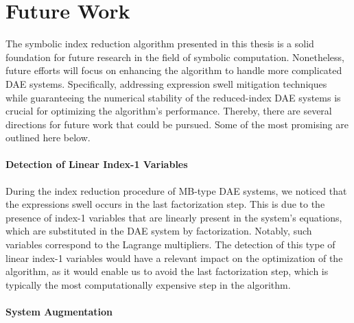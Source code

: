 \section{Future Work}
\label{chap5:sec:future_work}

The symbolic index reduction algorithm presented in this thesis is a solid foundation for future research in the field of symbolic computation. Nonetheless, future efforts will focus on enhancing the algorithm to handle more complicated \ac{DAE} systems. Specifically, addressing expression swell mitigation techniques while guaranteeing the numerical stability of the reduced-index \ac{DAE} systems is crucial for optimizing the algorithm's performance. Thereby, there are several directions for future work that could be pursued. Some of the most promising are outlined here below.

\paragraph{Detection of Linear Index-1 Variables}

During the index reduction procedure of \ac{MB}-type \ac{DAE} systems, we noticed that the expressions swell occurs in the last factorization step. This is due to the presence of index-1 variables that are linearly present in the system's equations, which are substituted in the \ac{DAE} system by factorization. Notably, such variables correspond to the Lagrange multipliers. The detection of this type of linear index-1 variables would have a relevant impact on the optimization of the algorithm, as it would enable us to avoid the last factorization step, which is typically the most computationally expensive step in the algorithm.

\paragraph{System Augmentation}

